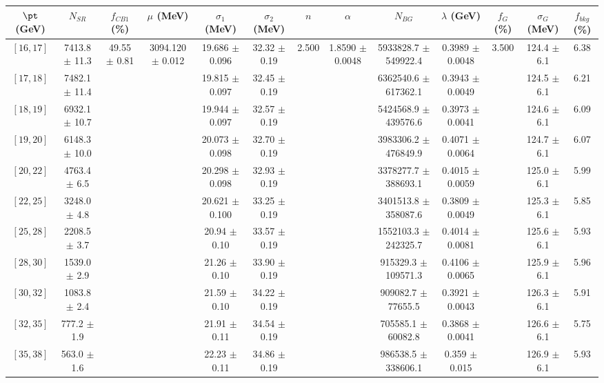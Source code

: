 \begin{tabular}{c||c|c|c|c|c|c|c|c|c|c|c||c}
$\pt$ (GeV) & $N_{SR}$ & $f_{CB1}$ (\%) & $\mu$ (MeV) & $\sigma_1$ (MeV) & $\sigma_2$ (MeV) & $n$ & $\alpha$ & $N_{BG}$ & $\lambda$ (GeV) & $f_G$ (\%) & $\sigma_G$ (MeV) & $f_{bkg}$ (\%) \\
\hline
$[16, 17]$ & 7413.8 $\pm$ 11.3 & \multirow{20}{*}{49.55 $\pm$ 0.81} & \multirow{20}{*}{3094.120 $\pm$ 0.012} & 19.686 $\pm$ 0.096 & 32.32 $\pm$ 0.19 & \multirow{20}{*}{2.500} & \multirow{20}{*}{1.8590 $\pm$ 0.0048} & 5933828.7 $\pm$ 549922.4 & 0.3989 $\pm$ 0.0048 & \multirow{20}{*}{3.500} & 124.4 $\pm$ 6.1 & 6.38\\
$[17, 18]$ & 7482.1 $\pm$ 11.4 &  &  & 19.815 $\pm$ 0.097 & 32.45 $\pm$ 0.19 &  &  & 6362540.6 $\pm$ 617362.1 & 0.3943 $\pm$ 0.0049 &  & 124.5 $\pm$ 6.1 & 6.21\\
$[18, 19]$ & 6932.1 $\pm$ 10.7 &  &  & 19.944 $\pm$ 0.097 & 32.57 $\pm$ 0.19 &  &  & 5424568.9 $\pm$ 439576.6 & 0.3973 $\pm$ 0.0041 &  & 124.6 $\pm$ 6.1 & 6.09\\
$[19, 20]$ & 6148.3 $\pm$ 10.0 &  &  & 20.073 $\pm$ 0.098 & 32.70 $\pm$ 0.19 &  &  & 3983306.2 $\pm$ 476849.9 & 0.4071 $\pm$ 0.0064 &  & 124.7 $\pm$ 6.1 & 6.07\\
$[20, 22]$ & 4763.4 $\pm$ 6.5 &  &  & 20.298 $\pm$ 0.098 & 32.93 $\pm$ 0.19 &  &  & 3378277.7 $\pm$ 388693.1 & 0.4015 $\pm$ 0.0059 &  & 125.0 $\pm$ 6.1 & 5.99\\
$[22, 25]$ & 3248.0 $\pm$ 4.8 &  &  & 20.621 $\pm$ 0.100 & 33.25 $\pm$ 0.19 &  &  & 3401513.8 $\pm$ 358087.6 & 0.3809 $\pm$ 0.0049 &  & 125.3 $\pm$ 6.1 & 5.85\\
$[25, 28]$ & 2208.5 $\pm$ 3.7 &  &  & 20.94 $\pm$ 0.10 & 33.57 $\pm$ 0.19 &  &  & 1552103.3 $\pm$ 242325.7 & 0.4014 $\pm$ 0.0081 &  & 125.6 $\pm$ 6.1 & 5.93\\
$[28, 30]$ & 1539.0 $\pm$ 2.9 &  &  & 21.26 $\pm$ 0.10 & 33.90 $\pm$ 0.19 &  &  & 915329.3 $\pm$ 109571.3 & 0.4106 $\pm$ 0.0065 &  & 125.9 $\pm$ 6.1 & 5.96\\
$[30, 32]$ & 1083.8 $\pm$ 2.4 &  &  & 21.59 $\pm$ 0.10 & 34.22 $\pm$ 0.19 &  &  & 909082.7 $\pm$ 77655.5 & 0.3921 $\pm$ 0.0043 &  & 126.3 $\pm$ 6.1 & 5.91\\
$[32, 35]$ & 777.2 $\pm$ 1.9 &  &  & 21.91 $\pm$ 0.11 & 34.54 $\pm$ 0.19 &  &  & 705585.1 $\pm$ 60082.8 & 0.3868 $\pm$ 0.0041 &  & 126.6 $\pm$ 6.1 & 5.75\\
$[35, 38]$ & 563.0 $\pm$ 1.6 &  &  & 22.23 $\pm$ 0.11 & 34.86 $\pm$ 0.19 &  &  & 986538.5 $\pm$ 338606.1 & 0.359 $\pm$ 0.015 &  & 126.9 $\pm$ 6.1 & 5.93\\

\end{tabular}
